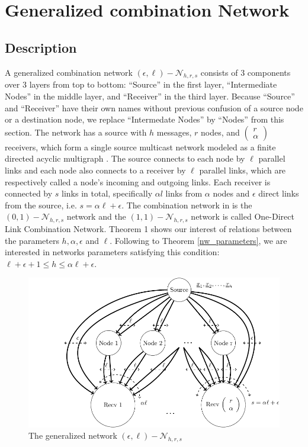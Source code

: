 \chapter{Generalized combination Network} \label{chap:general_network}

\section{Description \label{sec:Description_GCN}}

A generalized combination network $(\epsilon,\ell)-\mathcal{N}_{h,r,s}$
consists of 3 components over 3 layers from top to bottom: ``Source''
in the first layer, ``Intermediate Nodes'' in the middle layer,
and ``Receiver'' in the third layer. Because ``Source'' and ``Receiver''
have their own names without previous confusion of a source node or
a destination node, we replace ``Intermedate Nodes'' by ``Nodes''
from this section. The network has a source with $h$ messages, $r$
nodes, and $\left(\begin{array}{c}
r\\
\alpha
\end{array}\right)$ receivers, which form a single source multicast network modeled as
a finite directed acyclic multigraph \cite{Li:2003}. The source connects
to each node by $\ell$ parallel links and each node also connects
to a receiver by $\ell$ parallel links, which are respectively called
a node's incoming and outgoing links. Each receiver is connected by
$s$ links in total, specifically $\alpha l$ links from $\alpha$
nodes and $\epsilon$ direct links from the source, i.e. $s=\alpha\ell+\epsilon$.
The combination network in \cite{Riis:2006} is the $(0,1)-\mathcal{N}_{h,r,s}$
network and the $(1,1)-\mathcal{N}_{h,r,s}$ network is called One-Direct
Link Combination Network. Theorem 1 shows our interest of relations
between the parameters $h,\alpha,\epsilon$ and $\ell$. Following
to Theorem \ref{nw_parameters}, we are interested in networks parameters
satisfying this condition: $\ell+\epsilon+1\leq h\leq\alpha\ell+\epsilon$.
\begin{figure}[H]
\caption{The generalized network $(\epsilon,\ell)-\mathcal{N}_{h,r,s}$\label{fig:The-generalized-network}}

\centering{}\includegraphics[width=0.5\paperwidth]{./figures/generalized_combination_nw}
\end{figure}


